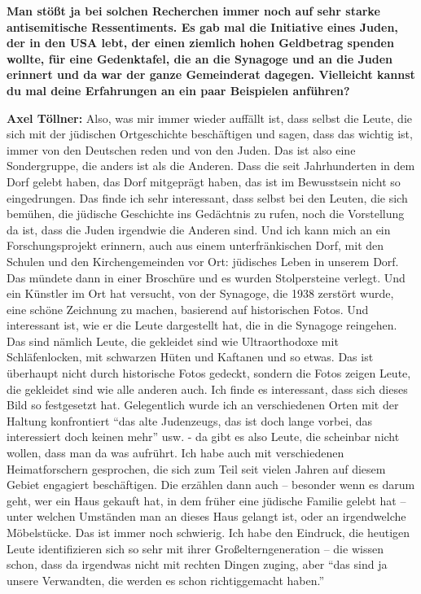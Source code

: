 \textbf{Man stößt ja bei solchen Recherchen immer noch auf sehr starke antisemitische Ressentiments.  
Es gab mal die Initiative eines Juden, der in den USA lebt, der einen ziemlich hohen Geldbetrag spenden wollte, für eine Gedenktafel, die an die Synagoge und an die Juden erinnert und da war der ganze Gemeinderat dagegen. Vielleicht kannst du mal deine Erfahrungen an ein paar Beispielen anführen?} 

\textbf{Axel Töllner:} Also, was mir immer wieder auffällt ist, dass selbst die Leute, die sich mit der jüdischen Ortgeschichte beschäftigen und sagen, dass das wichtig ist, immer von den Deutschen reden und von den Juden. Das ist also eine Sondergruppe, die anders ist als die Anderen. Dass die seit Jahrhunderten in dem Dorf gelebt haben, das Dorf mitgeprägt haben, das ist im Bewusstsein nicht so eingedrungen. Das finde ich sehr interessant, dass selbst bei den Leuten, die sich bemühen, die jüdische Geschichte ins Gedächtnis zu rufen, noch die Vorstellung da ist, dass die Juden irgendwie die Anderen sind.  
Und ich kann mich an ein Forschungsprojekt erinnern, auch aus einem unterfränkischen Dorf, mit den Schulen und den Kirchengemeinden vor Ort: jüdisches Leben in unserem Dorf. Das mündete dann in einer Broschüre und es wurden Stolpersteine verlegt. Und ein Künstler im Ort hat versucht, von der Synagoge, die 1938 zerstört wurde, eine schöne Zeichnung zu machen, basierend auf historischen Fotos. Und interessant ist, wie er die Leute dargestellt hat, die in die Synagoge reingehen. Das sind nämlich Leute, die gekleidet sind wie Ultraorthodoxe mit Schläfenlocken, mit schwarzen Hüten und Kaftanen und so etwas. Das ist überhaupt nicht durch historische Fotos gedeckt, sondern die Fotos zeigen Leute, die gekleidet sind wie alle anderen auch. Ich finde es interessant, dass sich dieses Bild so festgesetzt hat. 
Gelegentlich wurde ich an verschiedenen Orten mit der Haltung konfrontiert "`das alte Judenzeugs, das ist doch lange vorbei, das interessiert doch keinen mehr"' usw. - da gibt es also Leute, die scheinbar nicht wollen, dass man da was aufrührt. Ich habe auch mit verschiedenen Heimatforschern gesprochen, die sich zum Teil seit vielen Jahren auf diesem Gebiet engagiert beschäftigen. Die erzählen dann auch – besonder wenn es darum geht, wer ein Haus gekauft hat, in dem früher eine jüdische Familie gelebt hat – unter welchen Umständen man an dieses Haus gelangt ist, oder an irgendwelche Möbelstücke. Das ist immer noch schwierig.  
Ich habe den Eindruck, die heutigen Leute identifizieren sich so sehr mit ihrer Großelterngeneration – die wissen schon, dass da irgendwas nicht mit rechten Dingen zuging, aber "`das sind ja unsere Verwandten, die werden es schon richtiggemacht haben."' 

